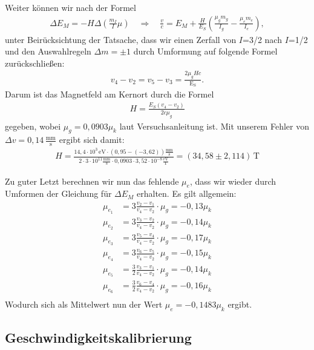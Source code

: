 \documentclass[10pt,twoside]{article}
\newcommand{\imp}{\Longrightarrow}
\renewcommand{\1}{^{-1}}
\renewcommand{\2}{^{-2}}
\newcommand{\3}{^{-3}}
\newcommand{\4}{^{-4}}
\newcommand{\5}{^{-5}}
\newcommand{\6}{^{-6}}
\newcommand{\7}{^{-7}}
\newcommand{\8}{^{-8}}
\newcommand{\9}{^{-9}}
\begin{document}
Weiter können wir nach der Formel 
\begin{align*}
\Delta E_M = - H \Delta \left( \frac{m_I}{I}\mu \right) \quad \imp \quad \frac{v}{c} = E_M + \frac{H}{{E}_{{S}}} \left( \frac{\mu_g m_g}{I_g}-\frac{\mu_e m_e}{I_e} \right){,}
\end{align*}
unter Beirücksichtung der Tatsache, dass wir einen Zerfall von $I$=3/2 nach $I$=1/2 und den Auswahlregeln $\Delta m = \pm 1$ durch Umformung auf folgende Formel zurückschließen:
\begin{align*}
v_4 - v_2 = v_5 - v_3 = \frac{2\mu_g H c}{\text{E}_{\text{S}}}{.}
\end{align*}
Darum ist das Magnetfeld am Kernort durch die Formel 
\begin{align*}
H = \frac{{E}_{{S}} (v_4 - v_2) }{2c\mu_g}
\end{align*}
gegeben, wobei $\mu_g=0,0903\mu_k$ laut Versuchsanleitung ist. Mit unserem Fehler von $\Delta v =0,14\,\frac{\text{mm}}{\text{s}}$ ergibt sich damit:
\begin{align*}
H =\frac{14,4\cdot 10^3\,\text{eV}\cdot (0,95-(-3,62))\frac{\text{mm}}{\text{s}} }{2\cdot 3\cdot 10^{11}\frac{\text{mm}}{\text{s}}\cdot 0,0903\cdot 3,52\cdot 10^{-8}\frac{\text{eV}}{\text{T}} } = (34,58\pm 2,114)\,\text{T}
\end{align*}

Zu guter Letzt berechnen wir nun das fehlende $\mu_e$, dass wir wieder durch Umformen der Gleichung für $\Delta E_M$ erhalten. Es gilt allgemein:
\begin{align*}
\mu_{e_1} &= 3 \frac{v_2-v_{1}}{v_4-v_2}\cdot\mu_g = -0,13\mu_k \\
\mu_{e_2} &= 3 \frac{v_3-v_{2}}{v_4-v_2}\cdot\mu_g = -0,14\mu_k \\
\mu_{e_3} &= 3 \frac{v_5-v_{4}}{v_4-v_2}\cdot\mu_g = -0,17\mu_k \\
\mu_{e_4} &= 3 \frac{v_6-v_{5}}{v_4-v_2}\cdot\mu_g = -0,15\mu_k \\
\mu_{e_5} &= \frac{3}{2} \frac{v_3-v_{1}}{v_4-v_2}\cdot\mu_g = -0,14\mu_k \\
\mu_{e_6} &= \frac{3}{2} \frac{v_6-v_{4}}{v_4-v_2}\cdot\mu_g = -0,16\mu_k \\
\end{align*}
Wodurch sich als Mittelwert nun der Wert $\mu_e = -0,1483\mu_k$ ergibt.

\subsection{Geschwindigkeitskalibrierung}
\end{document}
